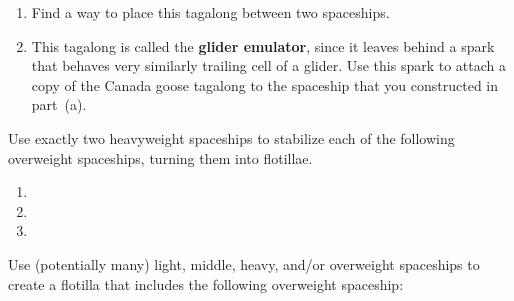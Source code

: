 \begin{multicols}{2}
\begin{problem}
		\begin{enumerate}[label=\bf\color{ocre}(\alph*)]
			\item Find a way to place this tagalong between two spaceships.
			
			\item This tagalong is called the \textbf{glider emulator}, since it leaves behind a spark that behaves very similarly trailing cell of a glider. Use this spark to attach a copy of the Canada goose tagalong to the spaceship that you constructed in part~(a).
		\end{enumerate}
	\end{problem}
	
	
	\mfilbreak
	
	
	\begin{problemstar}\label{exer:owss_flotilla} 
		Use exactly two heavyweight spaceships to stabilize each of the following overweight spaceships, turning them into flotillae.\setlength{\columnsep}{-15pt}\vspace*{-0.25cm}
		
		\begin{multicols}{2}
			\begin{enumerate}
				\item[\bf\color{ocre}(a)] 
				
				\item[\bf\color{ocre}(c)] 
				
				\item[\bf\color{ocre}(b)] 
			\end{enumerate}
		\end{multicols}
	\end{problemstar}
	
	
	\mfilbreak
	
	
	\begin{problemstar}\label{exer:large_owss_flotilla} 
		Use (potentially many) light, middle, heavy, and/or overweight spaceships to create a flotilla that includes the following overweight spaceship:
		
		\begin{center}
		\end{center}
	\end{problemstar}
	
	
	\mfilbreak
	

\end{multicols}
